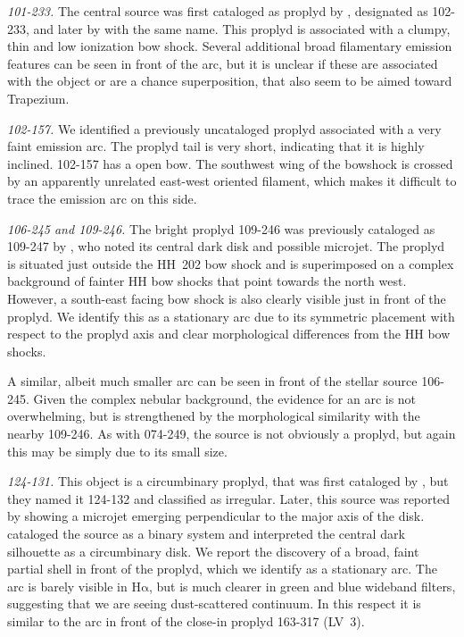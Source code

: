 \documentclass[iop, apj]{emulateapj}
\newcommand\ha{\ensuremath{\mathrm{H\alpha}}}
\begin{document}
\textit{101-233.} The central source was first cataloged as proplyd by \citet{ODell:1996a}, designated as 102-233, and later by \citet{Ricci:2008a} with the same name. This proplyd is associated with a clumpy, thin and low ionization bow shock. Several additional broad filamentary emission features can be seen in front of the arc, but it is unclear if these are associated with the object or are a chance superposition, that also seem to be aimed toward Trapezium. 

\textit{102-157.} We identified a previously uncataloged proplyd associated with a very faint emission arc. The proplyd tail is very short, indicating that it is highly inclined. 102-157 has a open bow. The southwest wing of the bowshock is crossed by an apparently unrelated east-west oriented filament, which makes it difficult to trace the emission arc on this side.


\textit{106-245 and 109-246.} The bright proplyd 109-246
\citep{Ricci:2008a} was previously cataloged as 109-247 by
\citet{Bally:2000a}, who noted its central dark disk and possible
microjet.  The proplyd is situated just outside the HH~202 bow shock
and is superimposed on a complex background of fainter HH bow shocks
that point towards the north west.  However, a
south-east facing bow shock is also clearly visible just in front of
the proplyd.  We identify this as a stationary arc due to its
symmetric placement with respect to the proplyd axis and clear
morphological differences from the HH bow shocks.

A similar, albeit much smaller arc can be seen in front of the stellar
source 106-245.  Given the complex nebular background, the evidence
for an arc is not overwhelming, but is strengthened by the
morphological similarity with the nearby 109-246.  As with 074-249, the
source is not obviously a proplyd, but again this may be simply due to
its small size.  


\textit{124-131.} This object is a circumbinary proplyd, that was
first cataloged by \citet{ODell:1996a}, but they named it 124-132 and
classified as irregular. Later, this source was reported by
\citet{Smith:2005a} showing a microjet emerging perpendicular to the
major axis of the disk. \citet{Ricci:2008a} cataloged the source as a
binary system and \citet{Robberto:2008a} interpreted the central dark
silhouette as a circumbinary disk.  We report the discovery of a
broad, faint partial shell in front of the proplyd, which we identify
as a stationary arc.  The arc is barely visible in \ha{}, but is much
clearer in green and blue wideband filters, suggesting that we are
seeing dust-scattered continuum.  In this respect it is similar to the
arc in front of the close-in proplyd 163-317 (LV~3).   
\end{document}
